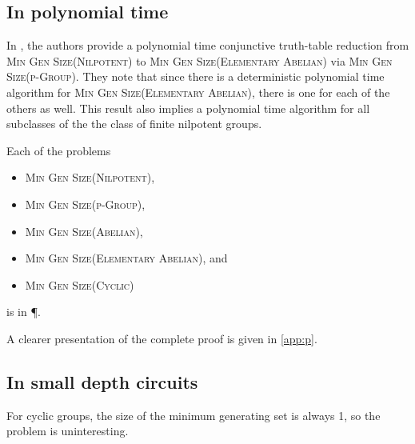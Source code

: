 \documentclass{article}
\begin{document}

\subsection{In polynomial time}

In \cite{at06}, the authors provide a polynomial time conjunctive truth-table reduction from \textsc{Min Gen Size(Nilpotent)} to \textsc{Min Gen Size(Elementary Abelian)} via \textsc{Min Gen Size(p-Group)}.
They note that since there is a deterministic polynomial time algorithm for \textsc{Min Gen Size(Elementary Abelian)}, there is one for each of the others as well.
This result also implies a polynomial time algorithm for all subclasses of the the class of finite nilpotent groups.

\begin{theorem}[{\cite[Theorem~7]{at06}}]
  Each of the problems
  \begin{itemize}
  \item \textsc{Min Gen Size(Nilpotent)},
  \item \textsc{Min Gen Size(p-Group)},
  \item \textsc{Min Gen Size(Abelian)},
  \item \textsc{Min Gen Size(Elementary Abelian)}, and
  \item \textsc{Min Gen Size(Cyclic)}
  \end{itemize}
  is in \P.
\end{theorem}

A clearer presentation of the complete proof is given in \autoref{app:p}.

\subsection{In small depth circuits}

For cyclic groups, the size of the minimum generating set is always 1, so the problem is uninteresting.
\end{document}
